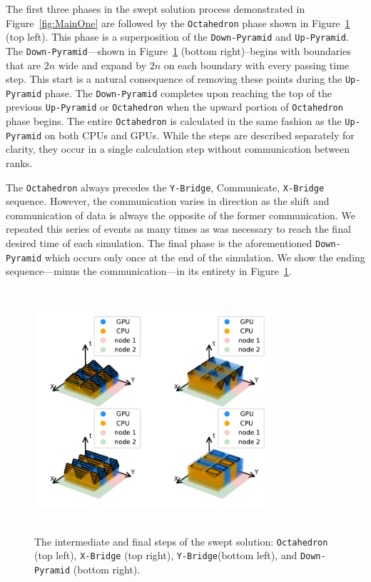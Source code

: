\documentclass[preprints,article,accept,moreauthors,pdftex]{Definitions/mdpi}
\def\Up{\texttt{Up-Pyramid}}
\def\Down{\texttt{Down-Pyramid}}
\def\Oct{\texttt{Octahedron}}
\def\Xb{\texttt{X-Bridge}}
\def\Yb{\texttt{Y-Bridge}}
\begin{document}
The first three phases in the swept solution process demonstrated in Figure~\ref{fig:MainOne} are followed by the \Oct{} phase shown in Figure~\ref{fig:MainTwo} (top left). This phase is a superposition of the \Down{} and \Up{}. The \Down{}---shown in Figure~\ref{fig:MainTwo} (bottom right)--begins with boundaries that are $2n$ wide and expand by $2n$ on each boundary with every passing time step. This start is a natural consequence of removing these points during the \Up{} phase. The \Down{} completes upon reaching the top of the previous \Up{} or \Oct{} when the upward portion of \Oct{} phase begins. The entire \Oct{} is calculated in the same fashion as the \Up{} on both CPUs and GPUs. While the steps are described separately for clarity, they occur in a single calculation step without communication between ranks. 

The \Oct{} always precedes the \Yb{}, Communicate, \Xb{} sequence. However, the communication varies in direction as the shift and communication of data is always the opposite of the former communication. We repeated this series of events as many times as was necessary to reach the final desired time of each simulation. The final phase is the aforementioned \Down{} which occurs only once at the end of the simulation. We show the ending sequence---minus the communication---in its entirety in Figure~\ref{fig:MainTwo}. 


\begin{figure}[htbp]
    \centering
    \includegraphics[height=9cm,width=0.78\textwidth, trim={1cm 0.6cm 0.25cm 0cm},clip]{figs/SubsPlot2.pdf}
    \caption{The intermediate and final steps of the swept solution: \Oct{} (top left), \Xb{} (top right), \Yb (bottom left), and \Down{} (bottom right).}
    \label{fig:MainTwo}
\end{figure}
\end{document}
